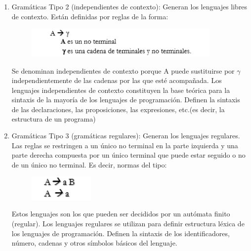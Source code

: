 \documentclass[a4paper,12pt]{letter}%
\begin{document}
\begin{letter}
\begin{enumerate}
\begin{lstlisting}

Se denominan gram\'aticas dependientes del contexto, porque, como se observa, A puede ser sustituido por $\gamma$ si est\'a acompa\~nada de $\alpha$ por la izquierda y de $\beta$ por la derecha.  
Estos lenguajes son todos los lenguajes que pueden ser reconocidos por una m\'aquina de Turing no determinista.

\end{lstlisting}


  \item Gram\'aticas Tipo 2 (independientes de contexto):
Generan los lenguajes libres de contexto. Est\'an definidas por  reglas de la forma:
\begin{center}
\begin{figure}
\includegraphics[width=0.9\textwidth]{tipo2.png} 
\centering
\end{figure}
\end{center}

Se denominan independientes de contexto porque A puede sustituirse por $\gamma$ independientemente de las cadenas por las que est\'e acompa\~nada. 
Los lenguajes independientes  de contexto constituyen la base te\'orica para la sintaxis de la mayor\'ia de los lenguajes de programaci\'on. Definen la sintaxis de las declaraciones, las proposiciones, las expresiones, etc.(es decir, la estructura de un programa)

  \item Gram\'aticas Tipo 3 (gram\'aticas regulares):
Generan los lenguajes regulares. Las reglas se restringen a un \'unico no terminal en la parte izquierda y una parte derecha compuesta por un \'unico terminal que puede estar seguido o no de un \'unico no terminal. Es decir, normas del tipo: 
\begin{center}
\begin{figure}
\includegraphics[width=0.3\textwidth]{tipo3.png} 
\centering
\end{figure}
\end{center}
Estos lenguajes son los que pueden ser decididos por un aut\'omata finito (regular). Los lenguajes regulares se utilizan para definir estructura l\'exica de los lenguajes de programaci\'on. Definen la sintaxis de los identificadores, n\'umero, cadenas y otros s\'imbolos b\'asicos del lenguaje. 



\end{enumerate}
\end{letter}
\end{document}
